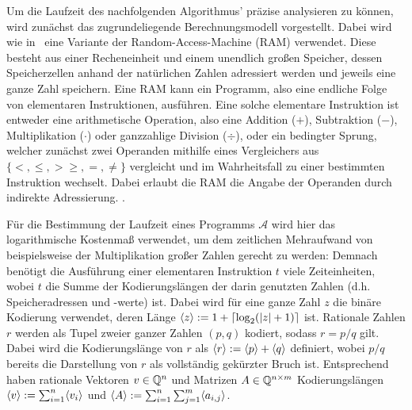 Um die Laufzeit des nachfolgenden Algorithmus' präzise analysieren zu können, wird zunächst das zugrundeliegende Berechnungsmodell vorgestellt.
Dabei wird wie in~\cite{Gritzmann2013} eine Variante der Random-Access-Machine (RAM) verwendet.
Diese besteht aus einer Recheneinheit und einem unendlich großen Speicher, dessen Speicherzellen anhand der natürlichen Zahlen adressiert werden und jeweils eine ganze Zahl speichern.
Eine RAM kann ein Programm, also eine endliche Folge von elementaren Instruktionen, ausführen.
Eine solche elementare Instruktion ist entweder eine arithmetische Operation, also eine Addition ($+$), Subtraktion ($-$), Multiplikation ($\cdot$) oder ganzzahlige Division ($\div$), oder ein bedingter Sprung, welcher zunächst zwei Operanden mithilfe eines Vergleichers aus $\{ <, \leq, > \geq, =, \neq \}$ vergleicht und im Wahrheitsfall zu einer bestimmten Instruktion wechselt.
Dabei erlaubt die RAM die Angabe der Operanden durch indirekte Adressierung.
.


Für die Bestimmung der Laufzeit eines Programms $\mathcal{A}$ wird hier das logarithmische Kostenmaß verwendet, um dem zeitlichen Mehraufwand von beispielsweise der Multiplikation großer Zahlen gerecht zu werden:
Demnach benötigt die Ausführung einer elementaren Instruktion $t$ viele Zeiteinheiten, wobei $t$ die Summe der Kodierungslängen der darin genutzten Zahlen (d.h. Speicheradressen und -werte) ist.
Dabei wird für eine ganze Zahl $z$ die binäre Kodierung verwendet, deren Länge $\langle z\rangle := 1 + \lceil \log_2(\lvert z\rvert+1) \rceil$ ist.
Rationale Zahlen $r$ werden als Tupel zweier ganzer Zahlen $(p,q)$ kodiert, sodass $r = p/q$ gilt.
Dabei wird die Kodierungslänge von $r$ als $\langle r\rangle:= \langle p\rangle + \langle q\rangle$ definiert, wobei $p/q$ bereits die Darstellung von $r$ als vollständig gekürzter Bruch ist.
Entsprechend haben rationale Vektoren $v\in\mathbb{Q}^n$ und Matrizen $A\in\mathbb{Q}^{n\times m}$ Kodierungslängen $\langle v\rangle := \sum_{i=1}^n \langle v_i\rangle$ und $\langle A\rangle:= \sum_{i=1}^n\sum_{j=1}^m \langle a_{i,j}\rangle$.

